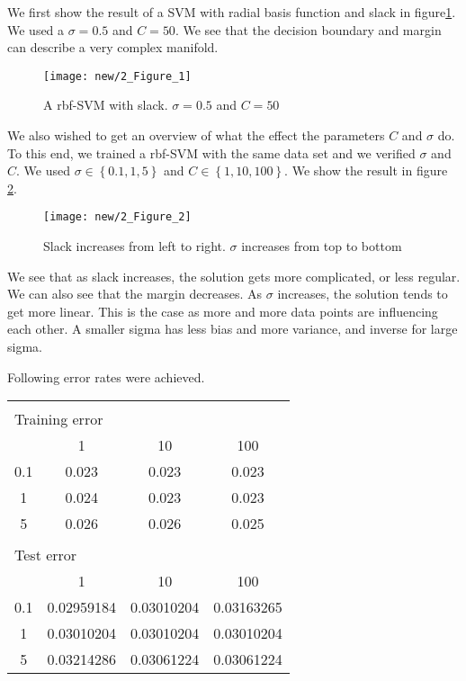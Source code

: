 We first show the result of a SVM with radial basis function and slack in figure\ref{task2::example}. We used a $\sigma = 0.5$ and $C=50$. We see that the decision boundary and margin can  describe a very complex manifold.
\begin{figure}
	\texttt{[image: new/2\_Figure\_1]}
	\caption{A rbf-SVM with slack. $\sigma = 0.5$ and $C=50$}
	\label{task2::example}
\end{figure}

We also wished to get an overview of what the effect the parameters $C$ and $\sigma$ do. To this end, we trained a rbf-SVM with the same data set and we verified $\sigma$ and $C$. We used $\sigma\in\left\{ 0.1, 1, 5 \right\}$ and  $C\in\left\{ 1, 10, 100 \right\}$. We show the result in figure \ref{task2::influence}.
\begin{figure}
	\texttt{[image: new/2\_Figure\_2]}
	\caption{Slack increases from left to right. $\sigma$ increases from top to bottom}
	\label{task2::influence}
\end{figure}

We see that as slack increases, the solution gets more complicated, or less regular. We can also see that the margin decreases. As $\sigma$ increases, the solution tends to get more linear. This is the case as more and more data points are influencing each other. A smaller sigma has less bias and more variance, and inverse for large sigma.

Following error rates were achieved.


\begin{tabular}{|c|c|c|c|}
\multicolumn{3}{l}{}\\
\multicolumn{3}{l}{Training error}\\
\hline
&1&10&100\\
\hline
0.1&0.023&0.023&0.023\\
\hline
1&0.024&0.023&0.023\\
\hline
5&0.026&0.026&0.025\\
\hline
\multicolumn{3}{l}{}\\
\multicolumn{3}{l}{Test error}\\
\hline
&1&10&100\\
\hline
0.1&0.02959184&0.03010204&0.03163265\\
\hline
1&0.03010204&0.03010204&0.03010204\\
\hline
5&0.03214286&0.03061224&0.03061224\\
\hline
\end{tabular}\\

